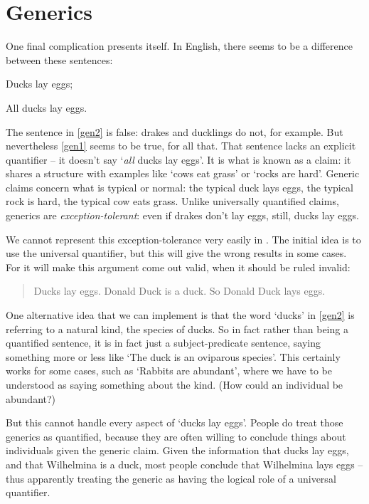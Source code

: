 \section{Generics} %
\label{sec:generics}
One final complication presents itself. In English, there seems to be a difference between these sentences: \begin{earg}
	\item[\ex{gen1}] Ducks lay eggs;
	\item[\ex{gen2}] All ducks lay eggs.
\end{earg}
The sentence in \ref{gen2} is false: drakes and ducklings do not, for example. But nevertheless \ref{gen1} seems to be true, for all that. That sentence lacks an explicit quantifier – it doesn't say `\emph{all} ducks lay eggs'. It is what is known as a  claim: it shares a structure with examples like `cows eat grass' or `rocks are hard'. Generic claims concern what is typical or normal: the typical duck lays eggs, the typical rock is hard, the typical cow eats grass. Unlike universally quantified claims, generics are \emph{exception-tolerant}: even if drakes don't lay eggs, still, ducks lay eggs.

We cannot represent this exception-tolerance very easily in \FOL. The initial idea is to use the universal quantifier, but this will give the wrong results in some cases. For it will make this argument come out valid, when it should be ruled invalid: \begin{quote}
Ducks lay eggs. Donald Duck is a duck. So Donald Duck lays eggs.
\end{quote} One alternative idea that we can implement is that the word `ducks' in \ref{gen2} is referring to a natural kind, the species of ducks. So in fact rather than being a quantified sentence, it is in fact just a subject-predicate sentence, saying something more or less like `The duck is an oviparous species'. This certainly works for some cases, such as `Rabbits are abundant', where we have to be understood as saying something about the kind. (How could an individual be abundant?) 

But this cannot handle every aspect of `ducks lay eggs'. People do treat those generics as quantified, because they are often willing to conclude things about individuals given the generic claim. Given the information that ducks lay eggs, and that Wilhelmina is a duck, most people conclude that Wilhelmina lays eggs – thus apparently treating the generic as having the logical role of a universal quantifier.

